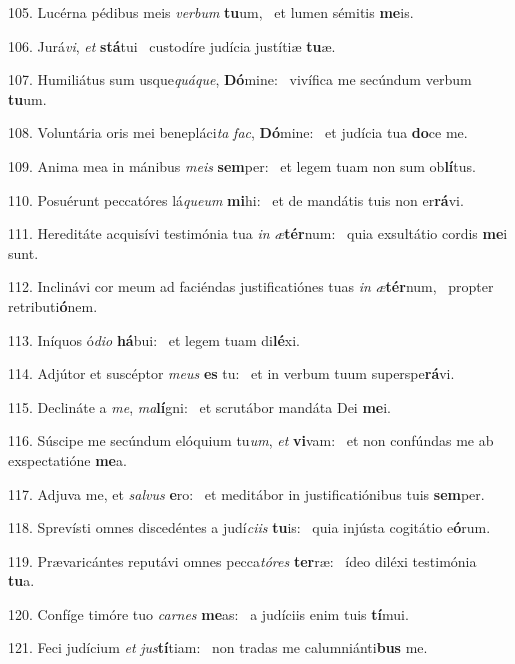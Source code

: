 105. Lucérna pédibus meis \textit{ver}\textit{bum} \textbf{tu}um, \ast\  et lumen sémitis \textbf{me}is.\

106. Jurá\textit{vi}, \textit{et} \textbf{stá}tui \ast\  custodíre judícia justítiæ \textbf{tu}æ.\

107. Humiliátus sum usque\textit{quá}\textit{que}, \textbf{Dó}mine: \ast\  vivífica me secúndum verbum \textbf{tu}um.\

108. Voluntária oris mei benepláci\textit{ta} \textit{fac}, \textbf{Dó}mine: \ast\  et judícia tua \textbf{do}ce me.\

109. Anima mea in mánibus \textit{me}\textit{is} \textbf{sem}per: \ast\  et legem tuam non sum ob\textbf{lí}tus.\

110. Posuérunt peccatóres lá\textit{que}\textit{um} \textbf{mi}hi: \ast\  et de mandátis tuis non er\textbf{rá}vi.\

111. Hereditáte acquisívi testimónia tua \textit{in} \textit{æ}\textbf{tér}num: \ast\  quia exsultátio cordis \textbf{me}i sunt.\

112. Inclinávi cor meum ad faciéndas justificatiónes tuas \textit{in} \textit{æ}\textbf{tér}num, \ast\  propter retributi\textbf{ó}nem.\

113. Iníquos ó\textit{di}\textit{o} \textbf{há}bui: \ast\  et legem tuam di\textbf{lé}xi.\

114. Adjútor et suscéptor \textit{me}\textit{us} \textbf{es} tu: \ast\  et in verbum tuum superspe\textbf{rá}vi.\

115. Declináte a \textit{me}, \textit{ma}\textbf{lí}gni: \ast\  et scrutábor mandáta Dei \textbf{me}i.\

116. Súscipe me secúndum elóquium tu\textit{um}, \textit{et} \textbf{vi}vam: \ast\  et non confúndas me ab exspectatióne \textbf{me}a.\

117. Adjuva me, et \textit{sal}\textit{vus} \textbf{e}ro: \ast\  et meditábor in justificatiónibus tuis \textbf{sem}per.\

118. Sprevísti omnes discedéntes a judí\textit{ci}\textit{is} \textbf{tu}is: \ast\  quia injústa cogitátio e\textbf{ó}rum.\

119. Prævaricántes reputávi omnes pecca\textit{tó}\textit{res} \textbf{ter}ræ: \ast\  ídeo diléxi testimónia \textbf{tu}a.\

120. Confíge timóre tuo \textit{car}\textit{nes} \textbf{me}as: \ast\  a judíciis enim tuis \textbf{tí}mui.\

121. Feci judícium \textit{et} \textit{jus}\textbf{tí}tiam: \ast\  non tradas me calumniánti\textbf{bus} me.\

